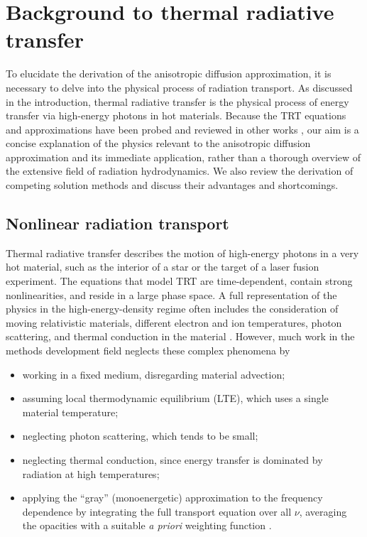 
\chapter{Background to thermal radiative transfer}\label{chap:trtBackground}

To elucidate the derivation of the anisotropic
diffusion approximation, it is necessary to delve into the physical
process of radiation transport. As discussed in the introduction,
thermal radiative transfer is the physical process of energy transfer via
high-energy photons in hot materials. Because the TRT equations and
approximations have been probed and reviewed in other works
\cite{Mih1984,Pom1973,Cas2004,Wol2008}, our aim is a concise explanation of the
physics relevant to the anisotropic diffusion approximation and its immediate
application, rather than a thorough overview of the extensive field of radiation
hydrodynamics. We also review the derivation of competing solution methods and
discuss their advantages and shortcomings.

\section{Nonlinear radiation transport}\label{sec:bgTrtEquations}
Thermal radiative transfer describes the motion of high-energy photons
in a very hot material, such as the interior of a star or the target of a laser
fusion experiment. The equations that model TRT are time-dependent, contain
strong nonlinearities, and reside in a large phase space.
A full representation of the physics in
the high-energy-density regime often includes the consideration of moving
relativistic materials, different electron and ion temperatures, photon
scattering, and thermal conduction in the material \cite{Mih1984}. However,
much work in the methods development field neglects these complex phenomena by
\begin{itemize}
  \item working in a fixed medium, disregarding material advection;
  \item assuming local thermodynamic equilibrium (LTE), which uses a single
    material temperature;
  \item neglecting photon scattering, which tends to be small;
  \item neglecting thermal conduction, since energy transfer is dominated by
    radiation at high temperatures;
  \item applying the ``gray'' (monoenergetic) approximation to the frequency
    dependence by integrating the full transport equation over all $\nu$, averaging 
    the
    opacities with a suitable \emph{a priori} weighting function \cite{Lar1983a}.
\end{itemize}

